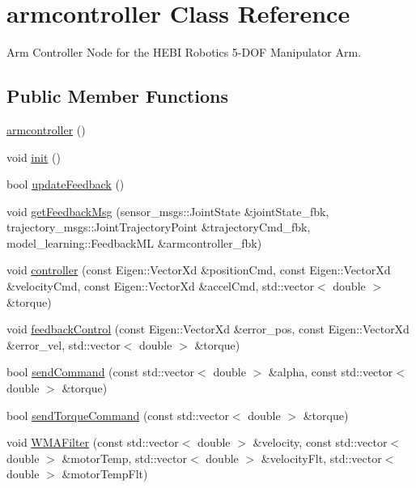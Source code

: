 \hypertarget{classarmcontroller}{}\section{armcontroller Class Reference}
\label{classarmcontroller}


Arm Controller Node for the H\+E\+BI Robotics 5-\/\+D\+OF Manipulator Arm.  


\subsection*{Public Member Functions}
\begin{DoxyCompactItemize}
\item 
\hyperlink{classarmcontroller_a7e2b5cd80851fced3e54641422fb04dd}{armcontroller} ()
\item 
void \hyperlink{classarmcontroller_a45794311f7ab89c67fe7423e07ea19d7}{init} ()
\item 
bool \hyperlink{classarmcontroller_a3cba85249ae1746aeac14d12b68becdc}{update\+Feedback} ()
\item 
void \hyperlink{classarmcontroller_af8bbda9cbee82997b7429ecda7c5412b}{get\+Feedback\+Msg} (sensor\+\_\+msgs\+::\+Joint\+State \&joint\+State\+\_\+fbk, trajectory\+\_\+msgs\+::\+Joint\+Trajectory\+Point \&trajectory\+Cmd\+\_\+fbk, model\+\_\+learning\+::\+Feedback\+ML \&armcontroller\+\_\+fbk)
\item 
void \hyperlink{classarmcontroller_ab2a040d42baac477ccc328d03b8c8903}{controller} (const Eigen\+::\+Vector\+Xd \&position\+Cmd, const Eigen\+::\+Vector\+Xd \&velocity\+Cmd, const Eigen\+::\+Vector\+Xd \&accel\+Cmd, std\+::vector$<$ double $>$ \&torque)
\item 
void \hyperlink{classarmcontroller_aa96c09e059c416f996774d4bf4b80619}{feedback\+Control} (const Eigen\+::\+Vector\+Xd \&error\+\_\+pos, const Eigen\+::\+Vector\+Xd \&error\+\_\+vel, std\+::vector$<$ double $>$ \&torque)
\item 
bool \hyperlink{classarmcontroller_aeefa5bf9839dd31ba78b33cfe092505c}{send\+Command} (const std\+::vector$<$ double $>$ \&alpha, const std\+::vector$<$ double $>$ \&torque)
\item 
bool \hyperlink{classarmcontroller_a124397944174948c82524f6632e21371}{send\+Torque\+Command} (const std\+::vector$<$ double $>$ \&torque)
\item 
void \hyperlink{classarmcontroller_ae16ff33ed407aabe5694da11807d8142}{W\+M\+A\+Filter} (const std\+::vector$<$ double $>$ \&velocity, const std\+::vector$<$ double $>$ \&motor\+Temp, std\+::vector$<$ double $>$ \&velocity\+Flt, std\+::vector$<$ double $>$ \&motor\+Temp\+Flt)

\end{DoxyCompactItemize}

